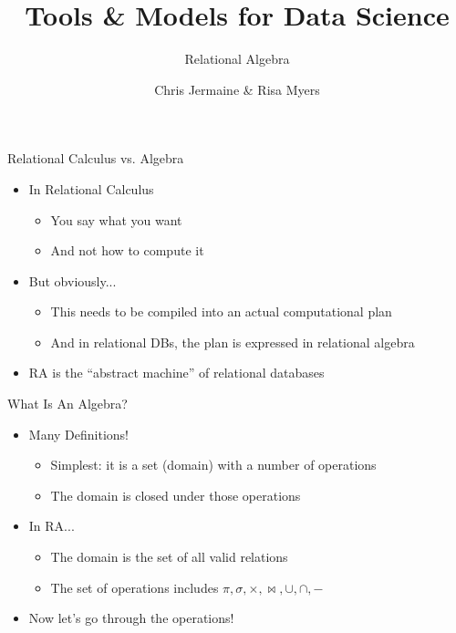 \documentclass[aspectratio=169]{beamer}
\title[]
{Tools \& Models for Data Science}
\subtitle
{Relational Algebra}
\author[]{Chris Jermaine \& Risa Myers}
\institute
{
  Rice University
}
\date[]{}
\begin{document}
\begin{frame}
 \titlepage
\end{frame}


\begin{frame}{Relational Calculus vs. Algebra}

\begin{itemize}
\item In Relational Calculus
	\begin{itemize}
	\item You say what you want
	\item And not how to compute it
	\end{itemize}
\item But obviously...
	\begin{itemize}
	\item This needs to be compiled into an actual computational plan
	\item And in relational DBs, the plan is expressed in relational algebra
	\end{itemize}
\item RA is the ``abstract machine'' of relational databases
\end{itemize}
\end{frame}

\begin{frame}{What Is An Algebra?}

\begin{itemize}
\item Many Definitions!
	\begin{itemize}
	\item Simplest: it is a set (domain) with a number of operations
	\item The domain is closed under those operations
	\end{itemize}
\item In RA...
	\begin{itemize}
	\item The domain is the set of all valid relations
	\item The set of operations includes $\pi, \sigma, \times, \bowtie, \cup, \cap, -$
	\end{itemize}
\item Now let's go through the operations!
\end{itemize}
\end{frame}
\end{document}
